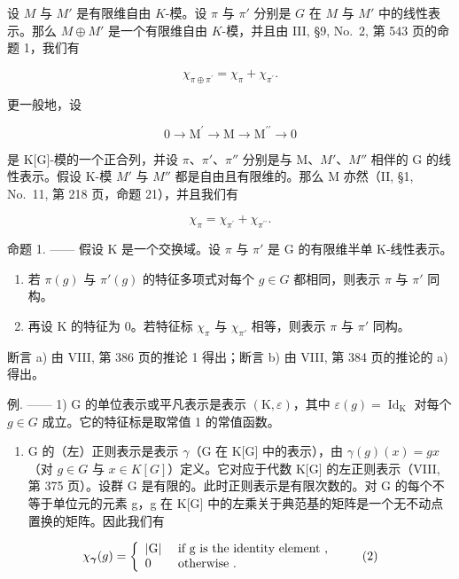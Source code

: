 设 \(M\) 与 \(M'\) 是有限维自由 \(K\)-模。设 \(\pi\) 与 \(\pi'\) 分别是 \(G\) 在 \(M\) 与 \(M'\) 中的线性表示。那么 \(M \oplus M'\) 是一个有限维自由 \(K\)-模，并且由 III, §9, No.~2, 第 543 页的命题 1，我们有

\[
\chi_ {\pi \oplus \pi^ {\prime}} = \chi_ {\pi} + \chi_ {\pi^ {\prime}}.
\]

更一般地，设

\[
0 \longrightarrow \mathrm{M} ^ {\prime} \longrightarrow \mathrm{M} \longrightarrow \mathrm{M} ^ {\prime \prime} \longrightarrow 0
\]

是 K{[}G{]}-模的一个正合列，并设 \(\pi\)、\(\pi'\)、\(\pi''\) 分别是与 M、\(M'\)、\(M''\) 相伴的 G 的线性表示。假设 K-模 \(M'\) 与 \(M''\) 都是自由且有限维的。那么 M 亦然（II, §1, No.~11, 第 218 页，命题 21），并且我们有

\[
\chi_ {\pi} = \chi_ {\pi^ {\prime}} + \chi_ {\pi^ {\prime \prime}}.\tag{1}
\]

命题 1. —— 假设 K 是一个交换域。设 \(\pi\) 与 \(\pi'\) 是 G 的有限维半单 K-线性表示。

\begin{enumerate}
\def\labelenumi{\alph{enumi})}
\item
  若 \(\pi(g)\) 与 \(\pi'(g)\) 的特征多项式对每个 \(g \in G\) 都相同，则表示 \(\pi\) 与 \(\pi'\) 同构。
\item
  再设 K 的特征为 0。若特征标 \(\chi_{\pi}\) 与 \(\chi_{\pi'}\) 相等，则表示 \(\pi\) 与 \(\pi'\) 同构。
\end{enumerate}

断言 a) 由 VIII, 第 386 页的推论 1 得出；断言 b) 由 VIII, 第 384 页的推论的 a) 得出。

例. —— 1) G 的单位表示或平凡表示是表示 \((\mathrm{K}, \varepsilon)\)，其中 \(\varepsilon(g) = \operatorname{Id}_{\mathrm{K}}\) 对每个 \(g \in G\) 成立。它的特征标是取常值 1 的常值函数。

\begin{enumerate}
\def\labelenumi{\arabic{enumi})}
\setcounter{enumi}{1}
\tightlist
\item
  G 的（左）正则表示是表示 \(\gamma\)（G 在 K{[}G{]} 中的表示），由 \(\gamma(g)(x)=gx\)（对 \(g\in G\) 与 \(x\in K[G]\)）定义。它对应于代数 K{[}G{]} 的左正则表示（VIII, 第 375 页）。设群 G 是有限的。此时正则表示是有限次数的。对 G 的每个不等于单位元的元素 g，g 在 K{[}G{]} 中的左乘关于典范基的矩阵是一个无不动点置换的矩阵。因此我们有
\end{enumerate}

\[
\chi_ {\boldsymbol {\gamma}} (g) = \left\{ \begin{array}{l l} | \mathrm{G} | & \text { if   g   is   the   identity   element }, \\ 0 & \text { otherwise }. \end{array} \right.\tag{2}
\]

